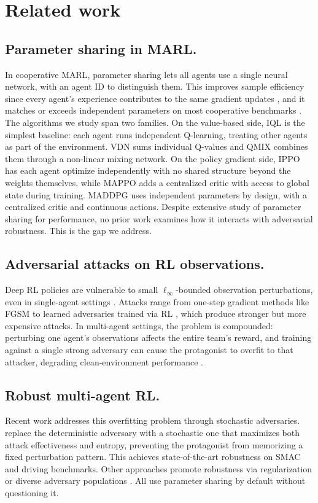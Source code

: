 \documentclass{article}
\begin{document}
\section{Related work}
\subsection{Parameter sharing in MARL.}
In cooperative MARL, parameter sharing lets all agents use a single neural network, with an agent ID to distinguish them. This improves sample efficiency since every agent's experience contributes to the same gradient updates \citep{gupta2017cooperative}, and it matches or exceeds independent parameters on most cooperative benchmarks \citep{yu2022mappo}. The algorithms we study span two families. On the value-based side, IQL \citep{tan1993iql} is the simplest baseline: each agent runs independent Q-learning, treating other agents as part of the environment. VDN \citep{sunehag2018vdn} sums individual Q-values and QMIX \citep{rashid2020qmix} combines them through a non-linear mixing network. On the policy gradient side, IPPO \citep{dewitt2020ippo} has each agent optimize independently with no shared structure beyond the weights themselves, while MAPPO \citep{yu2022mappo} adds a centralized critic with access to global state during training. MADDPG \citep{lowe2017maddpg} uses independent parameters by design, with a centralized critic and continuous actions. Despite extensive study of parameter sharing for performance, no prior work examines how it interacts with adversarial robustness. This is the gap we address.

\subsection{Adversarial attacks on RL observations.}
Deep RL policies are vulnerable to small $\ell_\infty$-bounded observation perturbations, even in single-agent settings \citep{zhang2021robust}. Attacks range from one-step gradient methods like FGSM \citep{goodfellow2014explaining} to learned adversaries trained via RL \citep{zhang2021atla}, which produce stronger but more expensive attacks. In multi-agent settings, the problem is compounded: perturbing one agent's observations affects the entire team's reward, and training against a single strong adversary can cause the protagonist to overfit to that attacker, degrading clean-environment performance \citep{guo2024multiagent}.

\subsection{Robust multi-agent RL.}
Recent work addresses this overfitting problem through stochastic adversaries. \citet{zhou2025robust} replace the deterministic adversary with a stochastic one that maximizes both attack effectiveness and entropy, preventing the protagonist from memorizing a fixed perturbation pattern. This achieves state-of-the-art robustness on SMAC and driving benchmarks. Other approaches promote robustness via regularization \citep{bukharin2023ernie} or diverse adversary populations \citep{vinitsky2020rap, yuan2023romance}. All use parameter sharing by default without questioning it.
\end{document}
